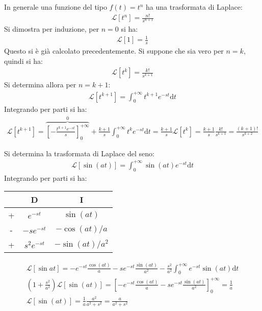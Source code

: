 \documentclass{article}
\newcommand{\df}{\mathrm{d}}
\numberwithin{equation}{subsection}
\begin{document}
In generale una funzione del tipo $f(t)=t^n$ ha una trasformata di Laplace:
\begin{gather*}
    \mathscr{L}\left[t^n\right]=\frac{n!}{s^{n+1}}
\end{gather*}
Si dimostra per induzione, per $n=0$ si ha:
\begin{gather*}
    \mathscr{L}[1]=\frac{1}{s}
\end{gather*}
Questo si è già calcolato precedentemente. 
Si suppone che sia vero per $n=k$, quindi si ha:
\begin{gather*}
    \mathscr{L}\left[t^{k}\right]=\frac{k!}{s^{k+1}}
\end{gather*}
Si determina allora per $n=k+1$:
\begin{gather*}
    \mathscr{L}\left[t^{k+1}\right]=\int_0^{+\infty} t^{k+1}e^{-st}\df t
\end{gather*}
Integrando per parti si ha:
\begin{gather*}
    \mathscr{L}\left[t^{k+1}\right]=\overbrace{\left[-\frac{t^{k+1}e^{-st}}{s}\right]_0^{+\infty}}^0+\frac{k+1}{s}\int_0^{+\infty}t^ke^{-st}\df t=\frac{k+1}{s}\mathscr{L}\left[t^k\right]=\frac{k+1}{s}\frac{k!}{s^{k+1}}=\frac{(k+1)!}{s^{k+2}}
\end{gather*}


Si determina la trasformata di Laplace del seno:
\begin{gather*}
    \mathscr{L}\left[\sin(at)\right]=\int_0^{+\infty}\sin(at)e^{-st}\df t
\end{gather*}
Integrando per parti si ha:
\begin{center}
    \begin{tabular}{|c|c|c|}
        \hline
        &D&I\\\hline
        +&$e^{-st}$&$\sin(at)$\\\hline
        -&$-se^{-st}$&$-\cos(at)/a$\\\hline
        +&$s^2e^{-st}$&$-\sin(at)/a^2$\\\hline
    \end{tabular}
\end{center}
\begin{gather*}
    \mathscr{L}[\sin at]=-e^{-st}\frac{\cos(at)}{a}-se^{-st}\frac{\sin(at)}{a^2}-\frac{s^2}{a^2}\int_0^{+\infty}e^{-st}\sin(at)\df t\\
    \left(1+\frac{s^2}{a^2}\right)\mathscr{L}[\sin(at)]=\left[-e^{-st}\frac{\cos(at)}{a}-se^{-st}\frac{\sin(at)}{a^2}\right]_0^{+\infty}=\frac{1}{a}\\
    \mathscr{L}[\sin(at)]=\frac{1}{a}\frac{a^2}{a^2+s^2}=\frac{a}{a^2+s^2}
\end{gather*}
\end{document}
